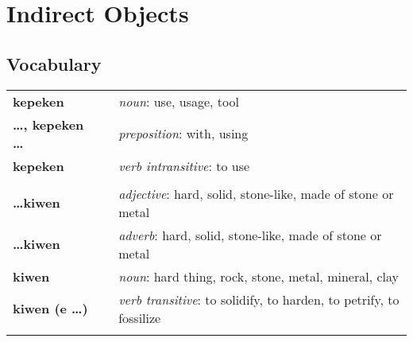 \section{Indirect Objects}
%
\subsection*{Vocabulary}
\begin{supertabular}{p{2,5cm}|ll}
    \textbf{kepeken}               &  & \textit{noun}: use, usage, tool                                                             \\ %
    \textbf{\dots , kepeken \dots} &  & \textit{preposition}: with, using                                                           \\ %
    \textbf{kepeken}               &  & \textit{verb intransitive}: to use                                                          \\ %
                                   &  &                                                                                             \\ %
    \textbf{\dots kiwen}           &  & \textit{adjective}: hard, solid, stone-like, made of stone or metal                         \\ %
    \textbf{\dots kiwen}           &  & \textit{adverb}: hard, solid, stone-like, made of stone or metal                            \\ %
    \textbf{kiwen}                 &  & \textit{noun}: hard thing, rock, stone, metal, mineral, clay                                \\ %
    \textbf{kiwen (e \dots)}       &  & \textit{verb transitive}: to solidify, to harden, to petrify, to fossilize                  \\ %
                                   &  &                                                                                             \\ %

\end{supertabular}
